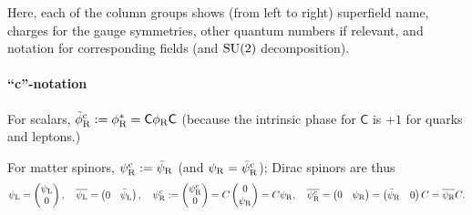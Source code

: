 \documentclass[CheatSheet]{subfiles}
\begin{document}
 \noindent
Here, each of the column groups shows (from left to right) superfield name, charges for the gauge symmetries, other quantum numbers if relevant, and notation for corresponding fields (and $\operatorname{\mathrm SU}(2)$ decomposition).


\paragraph{``c''-notation}
For scalars, $\tilde\phi_{\mathrm{R}}^{\mathrm{c}}:=\phi_{\mathrm{R}}^*=\mathsf{C} \phi_{\mathrm{R}}\mathsf{C}$ (because the intrinsic phase for $\mathsf C$ is $+1$ for quarks and leptons.)

For matter spinors, $\psi_{\mathrm{R}}^{\mathrm{c}}:=\bar\psi_{\mathrm{R}}$ (and $\psi_{\mathrm{R}}=\bar\psi_{\mathrm{R}}^{\mathrm{c}}$); Dirac spinors are thus
\begin{equation*}
\displaystyle \psi_{\mathrm{L}} =\begin{pmatrix}\psi_{\mathrm{L}}\\0\end{pmatrix},\quad
\displaystyle \overline{\psi_{\mathrm{L}}} = \begin{pmatrix}0&\bar\psi_{\mathrm{L}}\end{pmatrix},\quad
 \psi_{\mathrm{R}}^{\mathrm{c}} :=\begin{pmatrix}\psi_{\mathrm{R}}^{\mathrm{c}} \\ 0\end{pmatrix}=C\begin{pmatrix}0\\\psi_{\mathrm{R}}\end{pmatrix} = C\psi_{\mathrm{R}},
\quad
 \overline{\psi_{\mathrm{R}}^{\mathrm{c}}} = \begin{pmatrix}0 & \psi_{\mathrm{R}}\end{pmatrix} = \begin{pmatrix}\bar\psi_{\mathrm{R}} & 0\end{pmatrix}C  = \overline{\psi_{\mathrm{R}}} C.
\end{equation*}
\end{document}
